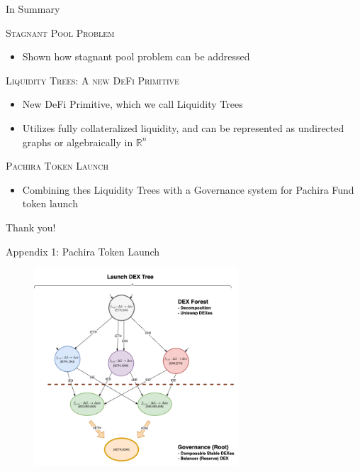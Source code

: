 \documentclass[10pt,xcolor=svgnames]{beamer} %
\begin{document}
\begin{frame}{In Summary}


\begin{exampleblock}{\textsc{Stagnant Pool Problem}}
\begin{itemize}
  \item Shown how stagnant pool problem can be addressed
\end{itemize}
\end{exampleblock}

\begin{exampleblock}{\textsc{Liquidity Trees: A new DeFi Primitive}}
\begin{itemize}
  \item New DeFi Primitive, which we call Liquidity Trees 
  \item Utilizes fully collateralized liquidity, and can be represented as undirected graphs or algebraically in $\mathbb{R}^n$
\end{itemize}
\end{exampleblock}

\begin{exampleblock}{\textsc{Pachira Token Launch}}
\begin{itemize}
  \item Combining thes Liquidity Trees with a Governance system for Pachira Fund token launch
\end{itemize}
\end{exampleblock}



\end{frame}


\begin{frame}[standout]
  Thank you! 
\end{frame}

\begin{frame}{Appendix 1: Pachira Token Launch}
\begin{figure}[h!]
\includegraphics[width=3in]{img/dex_forest_single_tree.png}
\label{fig:dex_forest}
\end{figure}
\end{frame}
\end{document}
